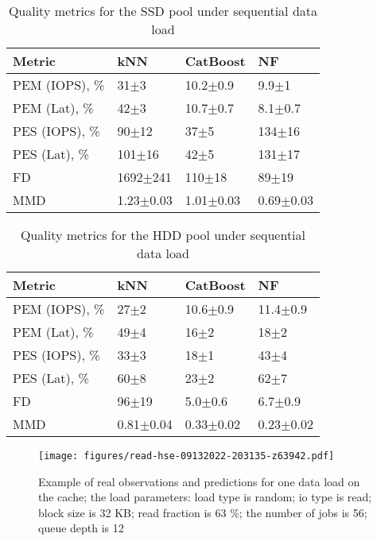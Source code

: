 \begin{table}[t]
\caption{Quality metrics for the SSD pool under sequential data load}
\small
\begin{tabularx}{\linewidth}{X@{}X@{}X@{}X@{}}
\hline
Metric & 
kNN & 
CatBoost &
NF \\
\hline
PEM (IOPS), \%  & 31$\pm$3          & 10.2$\pm$0.9     & 9.9$\pm$1 \\
PEM (Lat), \%   & 42$\pm$3          & 10.7$\pm$0.7     & 8.1$\pm$0.7 \\
PES (IOPS), \%  & 90$\pm$12       & 37$\pm$5        & 134$\pm$16 \\
PES (Lat), \%   & 101$\pm$16      & 42$\pm$5      & 131$\pm$17 \\
FD              & 1692$\pm$241      & 110$\pm$18      & 89$\pm$19 \\
MMD             & 1.23$\pm$0.03     & 1.01$\pm$0.03   & 0.69$\pm$0.03 \\
\hline
\end{tabularx}
\label{tab:metrics_ssd_seq}
\end{table}


\begin{table}[t]
\caption{Quality metrics for the HDD pool under sequential data load}
\small
\begin{tabularx}{\linewidth}{X@{}X@{}X@{}X@{}}
\hline
Metric & 
kNN & 
CatBoost &
NF \\
\hline
PEM (IOPS), \%  & 27$\pm$2   & 10.6$\pm$0.9     & 11.4$\pm$0.9 \\
PEM (Lat), \%   & 49$\pm$4   & 16$\pm$2         & 18$\pm$2 \\
PES (IOPS), \%  & 33$\pm$3     & 18$\pm$1         & 43$\pm$4 \\
PES (Lat), \%   & 60$\pm$8     & 23$\pm$2         & 62$\pm$7 \\
FD              & 96$\pm$19  & 5.0$\pm$0.6      & 6.7$\pm$0.9 \\
MMD             & 0.81$\pm$0.04   & 0.33$\pm$0.02    & 0.23$\pm$0.02 \\
\hline
\end{tabularx}
\label{tab:metrics_hdd_seq}
\end{table}


\begin{figure*}
\centerline{\texttt{[image: figures/read-hse-09132022-203135-z63942.pdf]}}
\caption{Example of real observations and predictions for one data load on the cache; the load parameters: load type is random; io type is read; block size is 32 KB; read fraction is 63 \%; the number of jobs is 56; queue depth is 12}
\label{fig:ex_cache_rnd}
\end{figure*}

